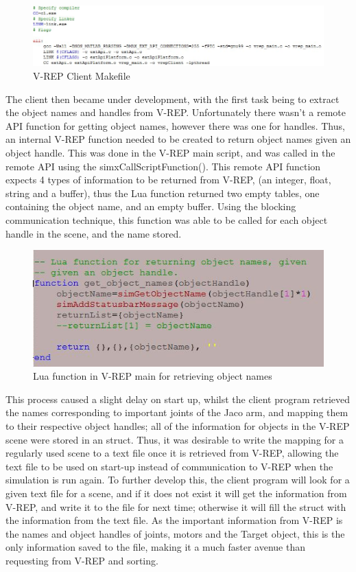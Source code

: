 \documentclass[12pt,openany,a4paper]{book}
\begin{document}
\begin{center}
\begin{figure}[htb]
  \includegraphics[width=1.1\linewidth]{makefile.jpg}
\caption{V-REP Client Makefile}
\end{figure}
\end{center}


The client then became under development, with the first task being to extract the object names and handles from V-REP. Unfortunately there wasn't a remote API function for getting object names, however there was one for handles. Thus, an internal V-REP function needed to be created to return object names given an object handle. This was done in the V-REP main script, and was called in the remote API using the simxCallScriptFunction(). This remote API function expects 4 types of information to be returned from V-REP, (an integer, float, string and a buffer), thus the Lua function returned two empty tables, one containing the object name, and an empty buffer. Using the blocking communication technique, this function was able to be called for each object handle in the scene, and the name stored.

\begin{center}
\begin{figure}[htb]
  \includegraphics[width=0.8\linewidth]{object_names.jpg}
\caption{Lua function in V-REP main for retrieving object names}
\end{figure}
\end{center}

This process caused a slight delay on start up, whilst the client program retrieved the names corresponding to important joints of the Jaco arm, and mapping them to their respective object handles; all of the information for objects in the V-REP scene were stored in an struct. Thus, it was desirable to write the mapping for a regularly used scene to a text file once it is retrieved from V-REP, allowing the text file to be used on start-up instead of communication to V-REP when the simulation is run again. To further develop this, the client program will look for a given text file for a scene, and if it does not exist it will get the information from V-REP, and write it to the file for next time; otherwise it will fill the struct with the information from the text file. As the important information from V-REP is the names and object handles of joints, motors and the Target object, this is the only information saved to the file, making it a much faster avenue than requesting from V-REP and sorting.
\end{document}
